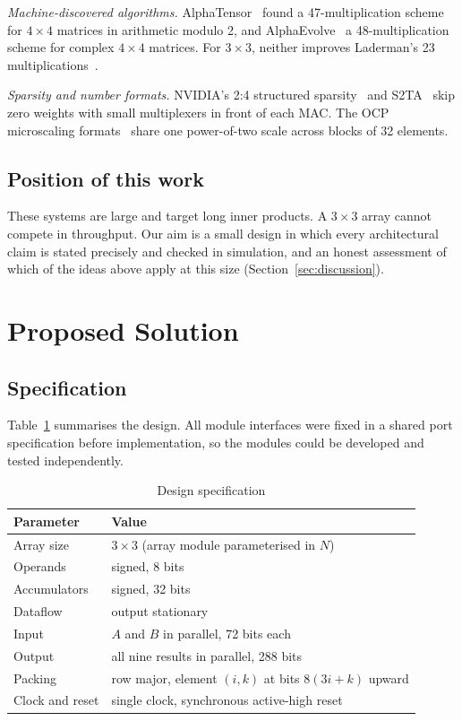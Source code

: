 \documentclass[conference]{IEEEtran}
\begin{document}
\emph{Machine-discovered algorithms.} AlphaTensor~\cite{alphatensor} found a 47-multiplication scheme for $4 \times 4$ matrices in arithmetic modulo 2, and AlphaEvolve~\cite{alphaevolve} a 48-multiplication scheme for complex $4 \times 4$ matrices. For $3 \times 3$, neither improves Laderman's 23 multiplications~\cite{laderman1976}.

\emph{Sparsity and number formats.} NVIDIA's 2:4 structured sparsity~\cite{mishra2021} and S2TA~\cite{s2ta} skip zero weights with small multiplexers in front of each MAC. The OCP microscaling formats~\cite{ocpmx} share one power-of-two scale across blocks of 32 elements.

\subsection{Position of this work}
These systems are large and target long inner products. A $3 \times 3$ array cannot compete in throughput. Our aim is a small design in which every architectural claim is stated precisely and checked in simulation, and an honest assessment of which of the ideas above apply at this size (Section~\ref{sec:discussion}).

\section{Proposed Solution}
\label{sec:design}

\subsection{Specification}
Table~\ref{tab:spec} summarises the design. All module interfaces were fixed in a shared port specification before implementation, so the modules could be developed and tested independently.

\begin{table}[t]
\caption{Design specification}
\label{tab:spec}
\centering
\begin{tabular}{@{}ll@{}}
\toprule
Parameter & Value \\
\midrule
Array size & $3 \times 3$ (array module parameterised in $N$) \\
Operands & signed, 8 bits \\
Accumulators & signed, 32 bits \\
Dataflow & output stationary \\
Input & $A$ and $B$ in parallel, 72 bits each \\
Output & all nine results in parallel, 288 bits \\
Packing & row major, element $(i,k)$ at bits $8(3i+k)$ upward \\
Clock and reset & single clock, synchronous active-high reset \\
\bottomrule
\end{tabular}
\end{table}
\end{document}
